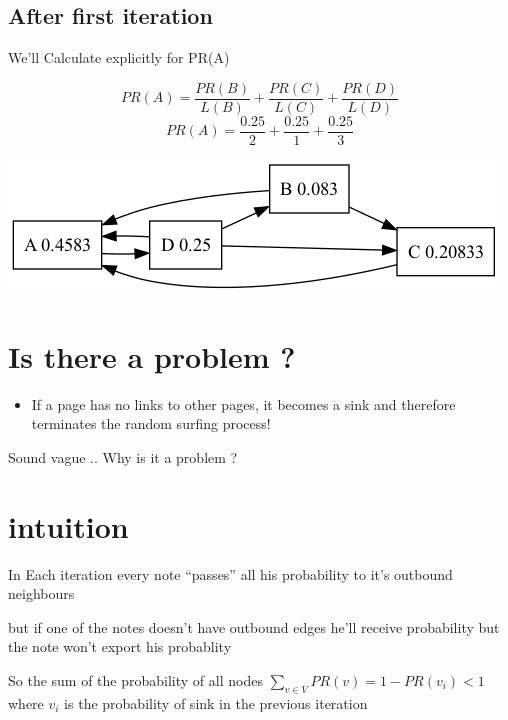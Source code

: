 \documentclass[11pt]{article}
\begin{document}
\subsection*{After first iteration}
\label{sec:org04aaf51}
We'll Calculate explicitly for PR(A)

\[ PR(A)= \frac{PR(B)}{L(B)} + \frac{PR(C)}{L(C)} + \frac{PR(D)}{L(D)} \]
\[ PR(A)= \frac{0.25}{2} +  \frac{0.25}{1} + \frac{0.25}{3}\]



\begin{center}
\includegraphics[width=.9\linewidth]{another_example1.png}
\end{center}

\section*{Is there a problem ?}
\label{sec:orge0099ff}

\begin{itemize}
\item If a page has no links to other pages, it becomes a sink and therefore terminates the random surfing process!
\end{itemize}
Sound vague .. Why is it a problem ?





\section*{intuition}
\label{sec:org8940000}
In Each iteration every note ``passes'' all his probability to it's outbound neighbours

but if one of the notes doesn't have outbound edges he'll receive probability but the note won't export his probablity

So the sum of the probability of all nodes \(\sum_{v \in V}PR(v) = 1-PR(v_i) < 1\) where \(v_i\) is the probability of sink in the previous iteration
\end{document}
